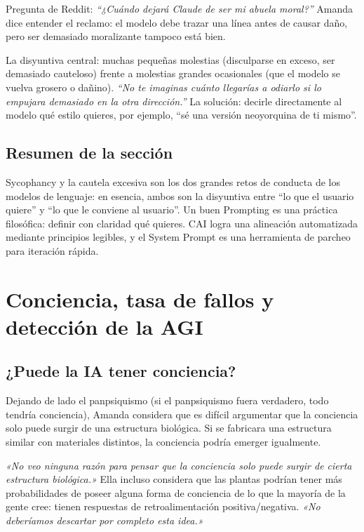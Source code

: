 \documentclass[a4paper]{article}
\begin{document}
Pregunta de Reddit: \textit{``¿Cuándo dejará Claude de ser mi abuela moral?''} Amanda dice entender el reclamo: el modelo debe trazar una línea antes de causar daño, pero ser demasiado moralizante tampoco está bien.

La disyuntiva central: muchas pequeñas molestias (disculparse en exceso, ser demasiado cauteloso) frente a molestias grandes ocasionales (que el modelo se vuelva grosero o dañino). \textit{``No te imaginas cuánto llegarías a odiarlo si lo empujara demasiado en la otra dirección.''} La solución: decirle directamente al modelo qué estilo quieres, por ejemplo, ``sé una versión neoyorquina de ti mismo''.

\subsection{Resumen de la sección}

Sycophancy y la cautela excesiva son los dos grandes retos de conducta de los modelos de lenguaje: en esencia, ambos son la disyuntiva entre ``lo que el usuario quiere'' y ``lo que le conviene al usuario''. Un buen Prompting es una práctica filosófica: definir con claridad qué quieres. CAI logra una alineación automatizada mediante principios legibles, y el System Prompt es una herramienta de parcheo para iteración rápida.
\section{Conciencia, tasa de fallos y detección de la AGI}

\subsection{¿Puede la IA tener conciencia?}

Dejando de lado el panpsiquismo (si el panpsiquismo fuera verdadero, todo tendría conciencia), Amanda considera que es difícil argumentar que la conciencia solo puede surgir de una estructura biológica. Si se fabricara una estructura similar con materiales distintos, la conciencia podría emerger igualmente.

\textit{«No veo ninguna razón para pensar que la conciencia solo puede surgir de cierta estructura biológica.»} Ella incluso considera que las plantas podrían tener más probabilidades de poseer alguna forma de conciencia de lo que la mayoría de la gente cree: tienen respuestas de retroalimentación positiva/negativa. \textit{«No deberíamos descartar por completo esta idea.»}
\end{document}
